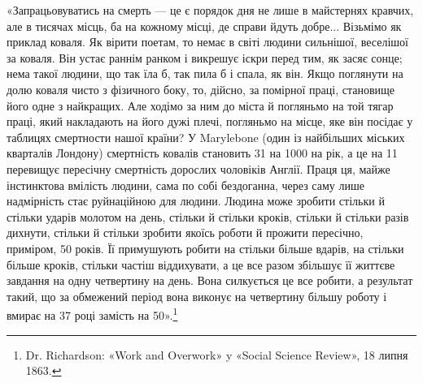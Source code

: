 «Запрацьовуватись на смерть — це є порядок дня не лише
в майстернях кравчих, але в тисячах місць, ба на кожному місці,
де справи йдуть добре... Візьмімо як приклад коваля. Як вірити
поетам, то немає в світі людини сильнішої, веселішої за коваля.
Він устає раннім ранком і викрешує іскри перед тим, як засяє
сонце; нема такої людини, що так їла б, так пила б і спала, як
він. Якщо поглянути на долю коваля чисто з фізичного боку, то,
дійсно, за помірної праці, становище його одне з найкращих.
Але ходімо за ним до міста й погляньмо на той тягар праці, який
накладають на його дужі плечі, погляньмо на місце, яке він посідає
у таблицях смертности нашої країни? У Marylebone (один із
найбільших міських кварталів Лондону) смертність ковалів становить
31 на 1000 на рік, а це на 11 перевищує пересічну смертність
дорослих чоловіків Англії. Праця ця, майже інстинктова вмілість
людини, сама по собі бездоганна, через саму лише надмірність
стає руйнаційною для людини. Людина може зробити стільки й
стільки ударів молотом на день, стільки й стільки кроків, стільки
й стільки разів дихнути, стільки й стільки зробити якоїсь роботи
й прожити пересічно, приміром, 50 років. Її примушують робити
на стільки більше вдарів, на стільки більше кроків, стільки частіш
віддихувати, а це все разом збільшує її життєве завдання на
одну четвертину на день. Вона силкується це все робити, а результат
такий, що за обмежений період вона виконує на четвертину
більшу роботу і вмирає на 37 році замість на 50».\footnote{
Dr. Richardson: «Work and Overwork» y «Social Science Review»,
18 липня 1863.
}
